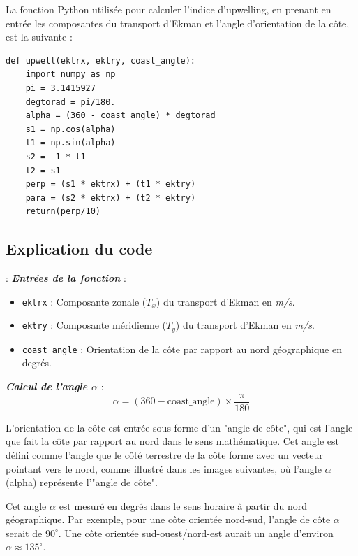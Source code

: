 La fonction Python utilisée pour calculer l'indice d'upwelling, en prenant en entrée les composantes du transport d'Ekman et l'angle d'orientation de la côte, est la suivante :

\begin{verbatim}
def upwell(ektrx, ektry, coast_angle):
    import numpy as np
    pi = 3.1415927
    degtorad = pi/180.
    alpha = (360 - coast_angle) * degtorad
    s1 = np.cos(alpha)
    t1 = np.sin(alpha)
    s2 = -1 * t1
    t2 = s1
    perp = (s1 * ektrx) + (t1 * ektry)
    para = (s2 * ektrx) + (t2 * ektry)
    return(perp/10)
\end{verbatim}

\subsection*{ Explication du code} :
\textbf{\textit{Entrées de la fonction}} : \\
   \begin{itemize}
       \item \texttt{ektrx} : Composante zonale ($T_x$) du transport d'Ekman en \textit{m/s}.
       \item \texttt{ektry} : Composante méridienne ($T_y$) du transport d'Ekman en \textit{m/s}.
       \item \texttt{coast\_angle} : Orientation de la côte par rapport au nord géographique en degrés.
   \end{itemize} 
   
\textbf{\textit{Calcul de l'angle $\alpha$}} : \\ 
   \[
   \alpha = (360 - \text{coast\_angle}) \times \frac{\pi}{180}
   \] 
   
   
L'orientation de la côte est entrée sous forme d'un "angle de côte", qui est l'angle que fait la côte par rapport au nord dans le sens mathématique. Cet angle est défini comme l'angle que le côté terrestre de la côte forme avec un vecteur pointant vers le nord, comme illustré dans les images suivantes, où l'angle $\alpha$ (alpha) représente l'"angle de côte". 
\vspace{0.5cm}

Cet angle $\alpha$ est mesuré en degrés dans le sens horaire à partir du nord géographique. Par exemple, pour une côte orientée nord-sud, l'angle de côte $\alpha$ serait de $90^\circ$. Une côte orientée sud-ouest/nord-est aurait un angle d'environ $\alpha \approx 135^\circ$.

